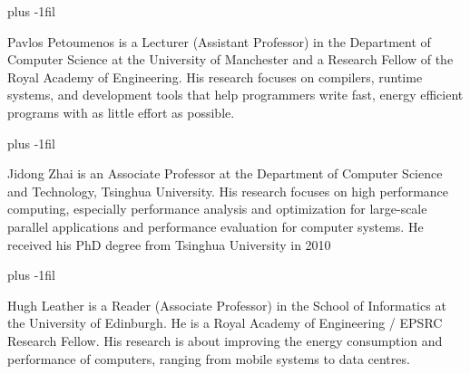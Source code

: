 \documentclass[10pt,journal,compsoc]{IEEEtran}
\begin{document}
\baselineskip plus -1fil
\begin{IEEEbiography}{Pavlos Petoumenos \textnormal{is a Lecturer (Assistant Professor) in the Department of Computer Science at the University of Manchester and
a Research Fellow of the Royal Academy of Engineering. His research focuses on compilers, runtime systems, and development tools that help programmers write fast, energy efficient programs with as little effort as possible.}}
\end{IEEEbiography}
\baselineskip plus -1fil
\begin{IEEEbiography}{Jidong Zhai \textnormal{is an Associate Professor at the Department of Computer Science and Technology, Tsinghua University. His research focuses on high performance computing, especially performance analysis and optimization for large-scale parallel applications and performance evaluation for computer systems. He received his PhD degree from Tsinghua University in 2010}}
\end{IEEEbiography}
\baselineskip plus -1fil
\begin{IEEEbiography}{Hugh Leather \textnormal{is a Reader (Associate Professor) in the School of Informatics at the University of Edinburgh. He is a Royal Academy of Engineering / EPSRC Research Fellow. His research is about improving the energy consumption and performance of computers, ranging from mobile systems to data centres.}}
\end{IEEEbiography}
\end{document}
